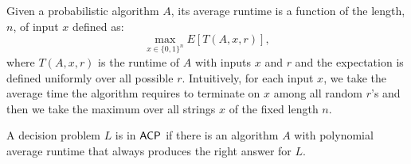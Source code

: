 \begin{definition}
Given a probabilistic algorithm $A$, its average runtime is a function of the length, $n$, of input $x$ defined as:
$$\max_{x \in \{0, 1\}^n} E[T(A, x, r)],$$
where $T(A, x, r)$ is the runtime of $A$ with inputs $x$ and $r$ and the expectation is defined uniformly over all possible $r$. Intuitively, for each input $x$, we take the average time the algorithm requires to terminate on $x$ among all random $r$'s and then we take the maximum over all strings $x$ of the fixed length $n$.  
\end{definition}
\begin{definition}\label{acpdef}
A decision problem $L$ is in $\mathsf{ACP}$ if there is an algorithm $A$ with polynomial average runtime that always produces the right answer for $L$.
\end{definition}

